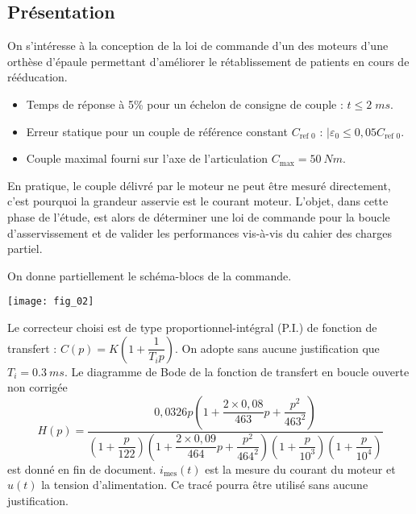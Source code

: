 \setcounter{exo}{0}
\begin{multicols}{2}


\subsection*{Présentation}
On s'intéresse à la conception de la loi de commande d'un des moteurs d'une orthèse d'épaule permettant d'améliorer le rétablissement de patients en cours de rééducation. 

\begin{obj}
\begin{itemize}
\item Temps de réponse à 5\% pour un échelon de consigne de couple : $t\leq 2\;ms$.
\item Erreur statique pour un couple de référence constant $C_{\text{ref 0}}$ : $|\varepsilon_0 \leq 0,05 C_{\text{ref 0}}$.
\item Couple maximal fourni sur l’axe de l’articulation $C_{\text{max}} = \SI{50}{N}{m}$.
\end{itemize}
\end{obj}

En pratique, le couple délivré par le moteur ne peut être mesuré directement, c’est pourquoi la grandeur
asservie est le courant moteur. L’objet, dans cette phase de l’étude, est alors de déterminer une loi de
commande pour la boucle d’asservissement et de valider les performances vis-à-vis du cahier des charges
partiel.

On donne partiellement le schéma-blocs de la commande. 

\begin{center}
\texttt{[image: fig\_02]}
\end{center}

Le correcteur choisi est de type proportionnel-intégral (P.I.) de fonction de transfert : $C(p)=K\left(1+\dfrac{1}{T_ip}\right)$. On adopte sans aucune justification que $T_i=\SI{0,3}{ms}$. 
Le diagramme de Bode de la fonction de transfert en boucle ouverte non corrigée 
\footnotesize
$$
H(p)=\dfrac{
0,0326 p \left( 1+\dfrac{2\times 0,08}{463}p+\dfrac{p^2}{463^2}\right)}
{
\left(1+\dfrac{p}{122} \right)
\left( 1+\dfrac{2\times 0,09}{464}p+\dfrac{p^2}{464^2}\right)
\left(1+\dfrac{p}{10^3} \right)
\left(1+\dfrac{p}{10^4} \right)
}
$$
\normalsize
est donné en fin de document. $i_{\text{mes}}(t)$ est la mesure du courant du moteur et $u(t)$ la tension d’alimentation. Ce tracé pourra être utilisé sans aucune justification.



\end{multicols}
